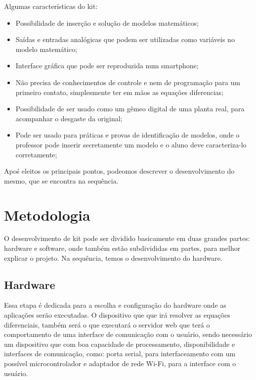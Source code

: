 \documentclass[journal]{IEEEtranTIE}
\begin{document}
Algumas características do kit:

\begin{itemize}[]
	   \item Possibilidade de inserção e solução de modelos matemáticos;
	   \item Saídas e entradas analógicas que podem ser utilizadas como variáveis no modelo matemático;
	   \item Interface gráfica que pode ser reproduzida num smartphone;
	   \item Não precisa de conhecimentos de controle e nem de programação para um primeiro contato, simplesmente ter em mãos as equações diferencias;
	   \item Possibilidade de ser usado como um gêmeo digital de uma planta real, para acompanhar o desgaste da original;
	   \item Pode ser usado para práticas e provas de identificação de modelos, onde o professor pode inserir secretamente um modelo e o aluno deve caracteriza-lo corretamente;
\end{itemize}

Apoś eleitos os principais pontos, podeomos descrever o desenvolvimento do mesmo, que se encontra na sequência.



\section{Metodologia}

O desenvolvimento de kit pode ser dividido basicamente em duas grandes partes: hardware e software, onde também estão subdivididas em partes, para melhor explicar o projeto. Na sequência, temos o desenvolvimento do hardware.

\subsection{Hardware}

Essa etapa é dedicada para a escolha e configuração do hardware onde as aplicações serão executadas. O dispositivo que que irá resolver as equações diferenciais, também será o que executará o servidor web que terá o comportamento de uma interface de comunicação com o usuário, sendo necessário um dispositivo que com boa capacidade de processamento, disponibilidade e interfaces de comunicação, como: porta serial, para interfaceamento com um possível microcontrolador e adaptador de rede Wi-Fi, para a interface com o usuário.
\end{document}
